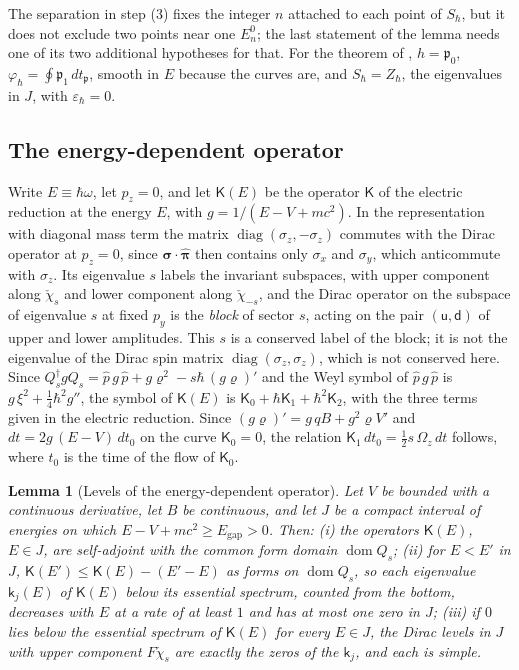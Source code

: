 \documentclass[aps,prd,onecolumn,tightenlines,nofootinbib,notitlepage,11pt,floatfix]{revtex4-2}
\theoremstyle{indentedtheorem}
\newtheorem{lemma}{Lemma}
\begin{document}
\noindent The separation in step (3) fixes the integer $n$ attached to each point of $S_\hbar$, but it does not exclude two points near one $E_n^0$; the last statement of the lemma needs one of its two additional hypotheses for that. For the theorem of \citet{IfaLouatiRouleux2017Bohr}, $h=\mathfrak{p}_0$, $\varphi_\hbar=\oint \mathfrak{p}_1\,dt_\mathfrak{p}$, smooth in $E$ because the curves are, and $S_\hbar=Z_\hbar$, the eigenvalues in $J$, with $\varepsilon_\hbar=0$.

\subsection{The energy-dependent operator}
\label{sup:energy_operator}

Write $E\equiv\hbar\omega$, let $p_z=0$, and let $\mathsf{K}(E)$ be the operator $\mathsf{K}$ of the electric reduction at the energy $E$, with $g=1/(E-V+mc^2)$. In the representation with diagonal mass term the matrix $\operatorname{diag}(\sigma_z,-\sigma_z)$ commutes with the Dirac operator at $p_z=0$, since $\boldsymbol{\sigma}\cdot\hat{\boldsymbol{\pi}}$ then contains only $\sigma_x$ and $\sigma_y$, which anticommute with $\sigma_z$. Its eigenvalue $s$ labels the invariant subspaces, with upper component along $\check{\chi}_s$ and lower component along $\check{\chi}_{-s}$, and the Dirac operator on the subspace of eigenvalue $s$ at fixed $p_y$ is the \emph{block} of sector $s$, acting on the pair $(\mathsf{u},\mathsf{d})$ of upper and lower amplitudes. This $s$ is a conserved label of the block; it is not the eigenvalue of the Dirac spin matrix $\operatorname{diag}(\sigma_z,\sigma_z)$, which is not conserved here. Since $Q_s^\dagger gQ_s=\hat{p}\,g\,\hat{p}+g\varrho^2-s\hbar\,(g\varrho)'$ and the Weyl symbol of $\hat{p}\,g\,\hat{p}$ is $g\,\xi^2+\tfrac{1}{4}\hbar^2g''$, the symbol of $\mathsf{K}(E)$ is $\mathsf{K}_0+\hbar\mathsf{K}_1+\hbar^2\mathsf{K}_2$, with the three terms given in the electric reduction. Since $(g\varrho)'=g\,qB+g^2\varrho V'$ and $dt=2g\,(E-V)\,dt_0$ on the curve $\mathsf{K}_0=0$, the relation $\mathsf{K}_1\,dt_0=\tfrac{1}{2}s\,\Omega_z\,dt$ follows, where $t_0$ is the time of the flow of $\mathsf{K}_0$.

\begin{lemma}[Levels of the energy-dependent operator]\label{lem:levels_K}
Let $V$ be bounded with a continuous derivative, let $B$ be continuous, and let $J$ be a compact interval of energies on which $E-V+mc^2\geq E_\text{gap}>0$. Then: (i) the operators $\mathsf{K}(E)$, $E\in J$, are self-adjoint with the common form domain $\operatorname{dom}Q_s$; (ii) for $E<E'$ in $J$, $\mathsf{K}(E')\leq\mathsf{K}(E)-(E'-E)$ as forms on $\operatorname{dom}Q_s$, so each eigenvalue $\mathsf{k}_j(E)$ of $\mathsf{K}(E)$ below its essential spectrum, counted from the bottom, decreases with $E$ at a rate of at least $1$ and has at most one zero in $J$; (iii) if $0$ lies below the essential spectrum of $\mathsf{K}(E)$ for every $E\in J$, the Dirac levels in $J$ with upper component $F\check{\chi}_s$ are exactly the zeros of the $\mathsf{k}_j$, and each is simple.
\end{lemma}
\end{document}
